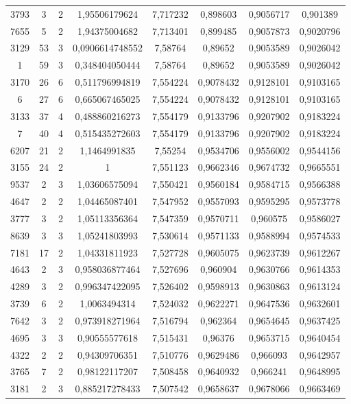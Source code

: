 \begin{longtable}{|c|c|c|c|c|c|c|c|}
3793 & 3 & 2 & 1,95506179624 & 7,717232 & 0,898603 & 0,9056717 & 0,901389 \\
7655 & 5 & 2 & 1,94375004682 & 7,713401 & 0,899485 & 0,9057873 & 0,9020796 \\
3129 & 53 & 3 & 0,0906614748552 & 7,58764 & 0,89652 & 0,9053589 & 0,9026042 \\
1 & 59 & 3 & 0,348404050444 & 7,58764 & 0,89652 & 0,9053589 & 0,9026042 \\
3170 & 26 & 6 & 0,511796994819 & 7,554224 & 0,9078432 & 0,9128101 & 0,9103165 \\
6 & 27 & 6 & 0,665067465025 & 7,554224 & 0,9078432 & 0,9128101 & 0,9103165 \\
3133 & 37 & 4 & 0,488860216273 & 7,554179 & 0,9133796 & 0,9207902 & 0,9183224 \\
7 & 40 & 4 & 0,515435272603 & 7,554179 & 0,9133796 & 0,9207902 & 0,9183224 \\
6207 & 21 & 2 & 1,1464991835 & 7,55254 & 0,9534706 & 0,9556002 & 0,9544156 \\
3155 & 24 & 2 & 1 & 7,551123 & 0,9662346 & 0,9674732 & 0,9665551 \\
9537 & 2 & 3 & 1,03606575094 & 7,550421 & 0,9560184 & 0,9584715 & 0,9566388 \\
4647 & 2 & 2 & 1,04465087401 & 7,547952 & 0,9557093 & 0,9595295 & 0,9573778 \\
3777 & 3 & 2 & 1,05113356364 & 7,547359 & 0,9570711 & 0,960575 & 0,9586027 \\
8639 & 3 & 3 & 1,05241803993 & 7,530614 & 0,9571133 & 0,9588994 & 0,9574533 \\
7181 & 17 & 2 & 1,04331811923 & 7,527728 & 0,9605075 & 0,9623739 & 0,9612267 \\
4643 & 2 & 3 & 0,958036877464 & 7,527696 & 0,960904 & 0,9630766 & 0,9614353 \\
4289 & 3 & 2 & 0,996347422095 & 7,526402 & 0,9598913 & 0,9630863 & 0,9613124 \\
3739 & 6 & 2 & 1,0063494314 & 7,524032 & 0,9622271 & 0,9647536 & 0,9632601 \\
7642 & 3 & 2 & 0,973918271964 & 7,516794 & 0,962364 & 0,9654645 & 0,9637425 \\
4695 & 3 & 3 & 0,90555577618 & 7,515431 & 0,96376 & 0,9653715 & 0,9640454 \\
4322 & 2 & 2 & 0,94309706351 & 7,510776 & 0,9629486 & 0,966093 & 0,9642957 \\
3765 & 7 & 2 & 0,98122117207 & 7,508458 & 0,9640932 & 0,966241 & 0,9648995 \\
3181 & 2 & 3 & 0,885217278433 & 7,507542 & 0,9658637 & 0,9678066 & 0,9663469 \\

\end{longtable}
